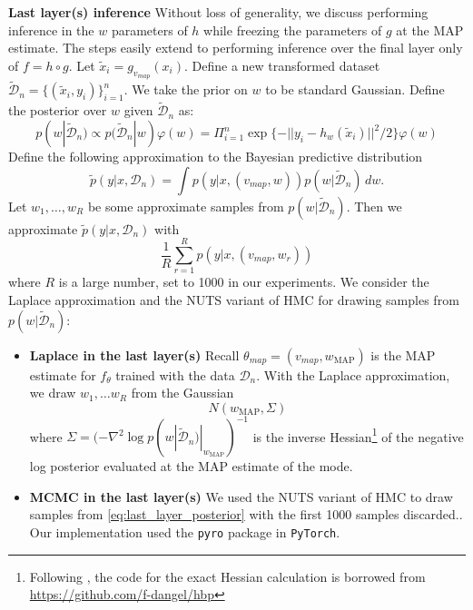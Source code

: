 \documentclass{article} %
\begin{document}
\textbf{Last layer(s) inference}
Without loss of generality, we discuss performing inference in the $w$ parameters of $h$ while freezing the parameters of $g$ at the MAP estimate. The steps easily extend to performing inference over the final layer only of $f = h \circ g$. Let $\tilde x_i = g_{v_{map}}(x_i)$. Define a new transformed dataset $\tilde{\mathcal D}_n = \{(\tilde x_i, y_i) \}_{i=1}^n$. We take the prior on $w$ to be standard Gaussian. 
Define the posterior over $w$ given $\tilde{\mathcal D}_n$ as:
\begin{equation}
p(w | \tilde{\mathcal D}_n) \propto p(\tilde{\mathcal D}_n | w) \varphi(w) = \Pi_{i=1}^n \exp\{-|| y_i - h_w(\tilde x_i) ||^2/2\} \varphi(w)
\label{eq:last_layer_posterior}
\end{equation}
Define the following approximation to the Bayesian predictive distribution
$$
\tilde p(y|x, \mathcal D_n) = \int p(y|x,(v_{map},w)) p(w|\tilde{\mathcal D}_n) \,dw.
$$
Let $w_1,\ldots,w_R$ be some approximate samples from $p(w | \tilde{\mathcal D}_n)$. Then we approximate $\tilde p(y|x, \mathcal D_n)$ with
\[
\frac{1}{R} \sum_{r=1}^R p(y|x,(v_{map},w_r))
\]
where $R$ is a large number, set to 1000 in our experiments. We consider the Laplace approximation and the NUTS variant of HMC for drawing samples from $p(w | \tilde{\mathcal D}_n)$:

\begin{itemize}
	\item \textbf{Laplace in the last layer(s)}
	Recall $\theta_{map} = (v_{map}, w_{\operatorname{MAP}})$ is the MAP estimate for $f_\theta$ trained with the data $\mathcal D_n$. With the Laplace approximation, we draw $w_1,\ldots w_R$ from the Gaussian
	\[
	N(w_{\operatorname{MAP}}, \Sigma)
	\]
	where $\Sigma = (- \nabla^2 \log p(w| \tilde{\mathcal D}_n) |_{w_{\operatorname{MAP}}})^{-1}$ is the inverse Hessian\footnote{Following \citet{kristiadi_being_2020}, the code for the exact Hessian calculation is borrowed from \url{https://github.com/f-dangel/hbp}} of the negative log posterior evaluated at the MAP estimate of the mode.
	\item \textbf{MCMC in the last layer(s)}
	We used the NUTS variant of HMC to draw samples from \eqref{eq:last_layer_posterior} with the first 1000 samples  discarded.. Our implementation used the \texttt{pyro} package in \texttt{PyTorch}.
	
\end{itemize}
\end{document}
